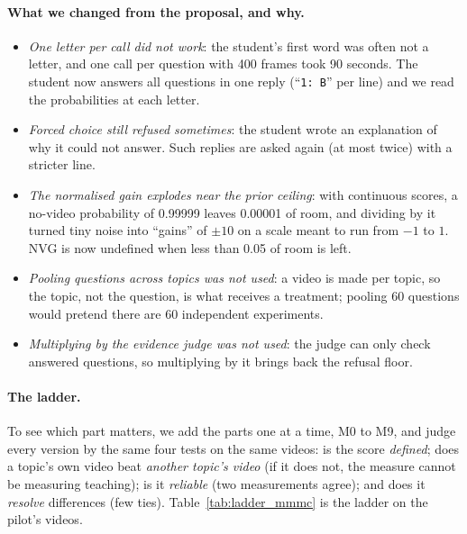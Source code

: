 \documentclass[11pt]{article}
\begin{document}
\paragraph{What we changed from the proposal, and why.}
\begin{itemize}
  \item \emph{One letter per call did not work}: the student's first word was often not a letter, and one call per
  question with 400 frames took 90 seconds. The student now answers all questions in one reply (``\texttt{1: B}'' per
  line) and we read the probabilities at each letter.
  \item \emph{Forced choice still refused sometimes}: the student wrote an explanation of why it could not answer.
  Such replies are asked again (at most twice) with a stricter line.
  \item \emph{The normalised gain explodes near the prior ceiling}: with continuous scores, a no-video probability of
  0.99999 leaves 0.00001 of room, and dividing by it turned tiny noise into ``gains'' of $\pm 10$ on a scale meant to
  run from $-1$ to $1$. NVG is now undefined when less than 0.05 of room is left.
  \item \emph{Pooling questions across topics was not used}: a video is made per topic, so the topic, not the
  question, is what receives a treatment; pooling 60 questions would pretend there are 60 independent experiments.
  \item \emph{Multiplying by the evidence judge was not used}: the judge can only check answered questions, so
  multiplying by it brings back the refusal floor.
\end{itemize}

\DiagDVGAIN
{}

\paragraph{The ladder.} To see which part matters, we add the parts one at a time, M0 to M9, and judge every version by
the same four tests on the same videos: is the score \emph{defined}; does a topic's own video beat \emph{another
topic's video} (if it does not, the measure cannot be measuring teaching); is it \emph{reliable} (two measurements
agree); and does it \emph{resolve} differences (few ties). Table~\ref{tab:ladder_mmmc} is the ladder on the pilot's
videos.
\end{document}
